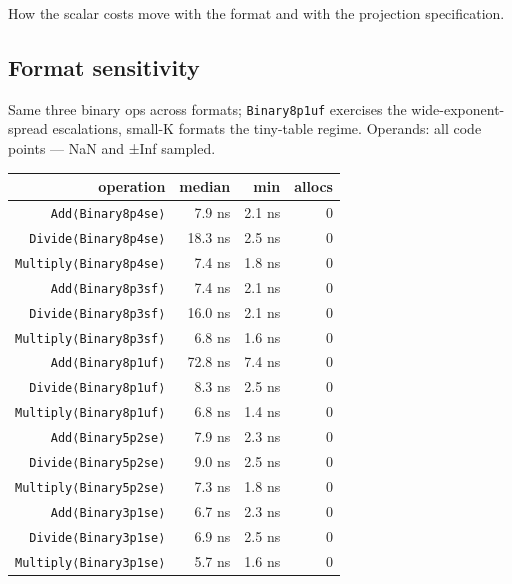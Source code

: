 \label{14065249436593140616}{}


How the scalar costs move with the format and with the projection specification.



\subsection{Format sensitivity}



\label{18234318524667261557}{}


Same three binary ops across formats; \texttt{Binary8p1uf} exercises the wide-exponent-spread escalations, small-K formats the tiny-table regime. Operands: all code points — NaN and ±Inf sampled.




\begin{table}[h]
\centering
\begin{tabulary}{\linewidth}{R R R R}
\toprule
operation & median & min & allocs \\
\toprule
\texttt{Add⟨Binary8p4se⟩} & 7.9 ns & 2.1 ns & 0 \\
\texttt{Divide⟨Binary8p4se⟩} & 18.3 ns & 2.5 ns & 0 \\
\texttt{Multiply⟨Binary8p4se⟩} & 7.4 ns & 1.8 ns & 0 \\
\texttt{Add⟨Binary8p3sf⟩} & 7.4 ns & 2.1 ns & 0 \\
\texttt{Divide⟨Binary8p3sf⟩} & 16.0 ns & 2.1 ns & 0 \\
\texttt{Multiply⟨Binary8p3sf⟩} & 6.8 ns & 1.6 ns & 0 \\
\texttt{Add⟨Binary8p1uf⟩} & 72.8 ns & 7.4 ns & 0 \\
\texttt{Divide⟨Binary8p1uf⟩} & 8.3 ns & 2.5 ns & 0 \\
\texttt{Multiply⟨Binary8p1uf⟩} & 6.8 ns & 1.4 ns & 0 \\
\texttt{Add⟨Binary5p2se⟩} & 7.9 ns & 2.3 ns & 0 \\
\texttt{Divide⟨Binary5p2se⟩} & 9.0 ns & 2.5 ns & 0 \\
\texttt{Multiply⟨Binary5p2se⟩} & 7.3 ns & 1.8 ns & 0 \\
\texttt{Add⟨Binary3p1se⟩} & 6.7 ns & 2.3 ns & 0 \\
\texttt{Divide⟨Binary3p1se⟩} & 6.9 ns & 2.5 ns & 0 \\
\texttt{Multiply⟨Binary3p1se⟩} & 5.7 ns & 1.6 ns & 0 \\
\bottomrule
\end{tabulary}

\end{table}



